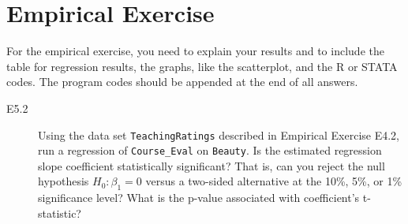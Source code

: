\documentclass[a4paper,11pt]{article}
\begin{document}
\section*{Empirical Exercise}
\label{sec:org264beb3}

For the empirical exercise, you need to explain your results and to
include the table for regression results, the graphs, like the
scatterplot, and the R or STATA codes. The program codes should be
appended at the end of all answers.

\begin{description}
\item[{E5.2}] Using the data set \texttt{TeachingRatings} described in Empirical
Exercise E4.2, run a regression of \texttt{Course\_Eval} on
\texttt{Beauty}. Is the estimated regression slope coefficient
statistically significant? That is, can you reject the null
hypothesis \(H_0: \beta_1 = 0\) versus a two-sided alternative
at the 10\%, 5\%, or 1\% significance level? What is the
p-value associated with coefficient's t-statistic?
\end{description}
\end{document}
